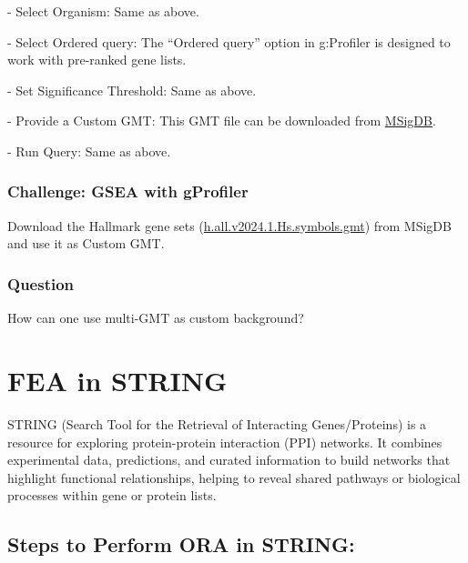 \documentclass[
]{book}
\begin{document}
{- Select Organism:} Same as above.

{- Select Ordered query:} The ``Ordered query'' option in g:Profiler is designed to work with pre-ranked gene lists.

{- Set Significance Threshold:} Same as above.

{- Provide a Custom GMT:} This GMT file can be downloaded from \href{https://www.gsea-msigdb.org/gsea/msigdb/index.jsp}{MSigDB}.

{- Run Query:} Same as above.

\hypertarget{challenge-gsea-with-gprofiler}{%
\subsubsection*{\texorpdfstring{\textbf{Challenge:} GSEA with gProfiler}{Challenge: GSEA with gProfiler}}\label{challenge-gsea-with-gprofiler}}

Download the Hallmark gene sets (\href{https://www.gsea-msigdb.org/}{h.all.v2024.1.Hs.symbols.gmt}) from MSigDB and use it as Custom GMT.

\hypertarget{question}{%
\subsubsection*{\texorpdfstring{\textbf{Question }}{Question }}\label{question}}

How can one use multi-GMT as custom background?

\hypertarget{fea-in-string}{%
\section{\texorpdfstring{FEA in STRING }{FEA in STRING }}\label{fea-in-string}}

STRING (Search Tool for the Retrieval of Interacting Genes/Proteins) is a resource for exploring protein-protein interaction (PPI) networks. It combines experimental data, predictions, and curated information to build networks that highlight functional relationships, helping to reveal shared pathways or biological processes within gene or protein lists.

\hypertarget{steps-to-perform-ora-in-string}{%
\subsection{Steps to Perform ORA in STRING:}\label{steps-to-perform-ora-in-string}}
\end{document}
